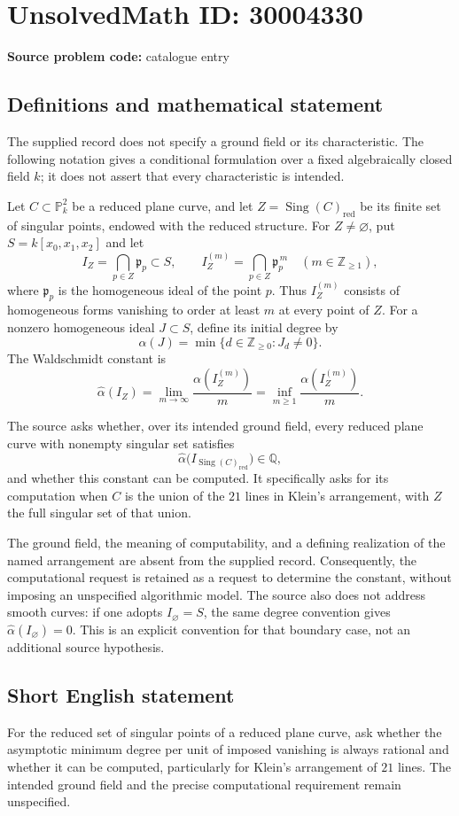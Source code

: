 \documentclass[11pt]{article}
\newcommand{\Z}{\mathbb{Z}}
\newcommand{\Q}{\mathbb{Q}}
\newcommand{\PP}{\mathbb{P}}
\begin{document}
\section*{UnsolvedMath ID: 30004330}
\textbf{Source problem code:} catalogue entry
\subsection{Definitions and mathematical statement}
The supplied record does not specify a ground field or its characteristic. The following notation gives a conditional formulation over a fixed algebraically closed field \(k\); it does not assert that every characteristic is intended.

Let \(C\subset\PP^2_k\) be a reduced plane curve, and let \(Z=\operatorname{Sing}(C)_{\mathrm{red}}\) be its finite set of singular points, endowed with the reduced structure. For \(Z\ne\varnothing\), put \(S=k[x_0,x_1,x_2]\) and let
\[
I_Z=\bigcap_{p\in Z}\mathfrak p_p\subset S,
\qquad
I_Z^{(m)}=\bigcap_{p\in Z}\mathfrak p_p^{\,m}
\quad(m\in\Z_{\ge1}),
\]
where \(\mathfrak p_p\) is the homogeneous ideal of the point \(p\). Thus \(I_Z^{(m)}\) consists of homogeneous forms vanishing to order at least \(m\) at every point of \(Z\). For a nonzero homogeneous ideal \(J\subset S\), define its initial degree by
\[
\alpha(J)=\min\{d\in\Z_{\ge0}:J_d\ne0\}.
\]
The Waldschmidt constant is
\[
\widehat\alpha(I_Z)
=\lim_{m\to\infty}\frac{\alpha(I_Z^{(m)})}{m}
=\inf_{m\ge1}\frac{\alpha(I_Z^{(m)})}{m}.
\]

The source asks whether, over its intended ground field, every reduced plane curve with nonempty singular set satisfies
\[
\widehat\alpha\bigl(I_{\operatorname{Sing}(C)_{\mathrm{red}}}\bigr)\in\Q,
\]
and whether this constant can be computed. It specifically asks for its computation when \(C\) is the union of the \(21\) lines in Klein's arrangement, with \(Z\) the full singular set of that union.

The ground field, the meaning of computability, and a defining realization of the named arrangement are absent from the supplied record. Consequently, the computational request is retained as a request to determine the constant, without imposing an unspecified algorithmic model. The source also does not address smooth curves: if one adopts \(I_{\varnothing}=S\), the same degree convention gives \(\widehat\alpha(I_{\varnothing})=0\). This is an explicit convention for that boundary case, not an additional source hypothesis.
\subsection{Short English statement}
For the reduced set of singular points of a reduced plane curve, ask whether the asymptotic minimum degree per unit of imposed vanishing is always rational and whether it can be computed, particularly for Klein's arrangement of \(21\) lines. The intended ground field and the precise computational requirement remain unspecified.
\end{document}
